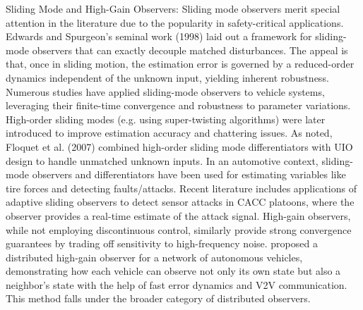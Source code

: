 Sliding Mode and High-Gain Observers: Sliding mode observers merit special attention in the literature due to the popularity in safety-critical applications. Edwards and Spurgeon’s seminal work (1998) laid out a framework for sliding-mode observers that can exactly decouple matched disturbances. The appeal is that, once in sliding motion, the estimation error is governed by a reduced-order dynamics independent of the unknown input, yielding inherent robustness. Numerous studies have applied sliding-mode observers to vehicle systems, leveraging their finite-time convergence and robustness to parameter variations. High-order sliding modes (e.g. using super-twisting algorithms) were later introduced to improve estimation accuracy and chattering issues. As noted, Floquet et al. (2007) combined high-order sliding mode differentiators with UIO design to handle unmatched unknown inputs. In an automotive context, sliding-mode observers and differentiators have been used for estimating variables like tire forces and detecting faults/attacks. Recent literature includes applications of adaptive sliding observers to detect sensor attacks in CACC platoons, where the observer provides a real-time estimate of the attack signal. High-gain observers, while not employing discontinuous control, similarly provide strong convergence guarantees by trading off sensitivity to high-frequency noise. \cite{MengDistributedHighGainObserver} proposed a distributed high-gain observer for a network of autonomous vehicles, demonstrating how each vehicle can observe not only its own state but also a neighbor’s state with the help of fast error dynamics and V2V communication. This method falls under the broader category of distributed observers.

